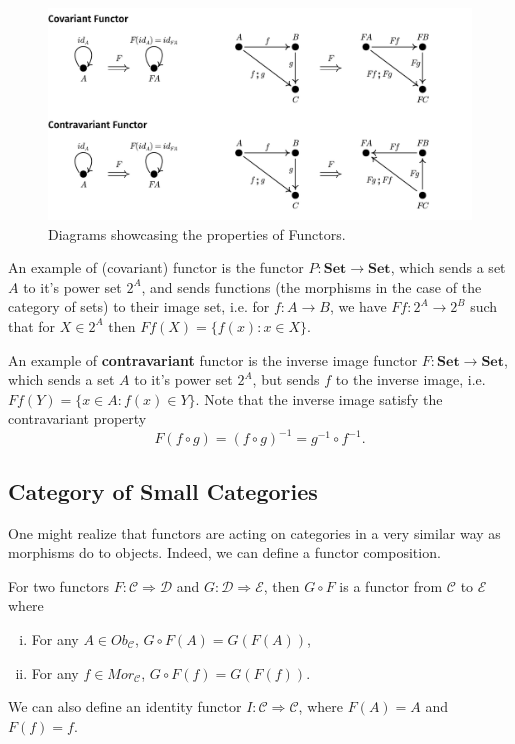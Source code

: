 \begin{figure}[H]
	\begin{center}
		\includegraphics[width=1.1\textwidth]{./notebooks/Functor.pdf}
	\end{center}
	\caption{Diagrams showcasing the properties of Functors.}
	\label{fig:Functor}
\end{figure}

\begin{example}
	An example of (covariant) functor is the functor
	$P : \mathbf{Set} \to \mathbf{Set}$, which sends a set $A$
	to it's power set $2^A$, and sends functions (the morphisms in the case
	of the category of sets) to their image set, i.e. for $f:A \to B$,
	we have $Ff:2^A \to 2^B$ such that for $X \in 2^A$ then $Ff(X) = \{f(x) : x \in X\}$.

	An example of \textbf{contravariant} functor is the inverse image functor
	$F : \mathbf{Set} \to \mathbf{Set}$, which sends a set $A$ to it's
	power set $2^A$, but sends $f$ to the inverse image, i.e.
	$Ff(Y) = \{x \in A : f(x) \in Y\}$.
	Note that the inverse image satisfy the contravariant property
	\begin{displaymath}
		F(f \circ g) = (f \circ g) ^{-1} = g^{-1} \circ f^{-1}.
	\end{displaymath}
\end{example}

\subsection{Category of Small Categories}

One might realize that functors are acting on categories in a very similar way as morphisms
do to objects. Indeed, we can define a functor composition.

\begin{definition}
	For two functors $F:\mathcal C \Rightarrow \mathcal D$
	and $G:\mathcal D \Rightarrow \mathcal E$, then $G \circ F$ is
	a functor from $\mathcal C$ to $\mathcal E$ where
	\begin{enumerate}[(i)]
		\item For any $A \in Ob_\mathcal C$, $G\circ F (A) = G(F(A))$,
		\item For any $f \in Mor_\mathcal C$, $G\circ F (f) = G(F(f))$.
	\end{enumerate}
\end{definition}
We can also define an identity functor $I:\mathcal C \Rightarrow \mathcal C$,
where $F(A) = A$ and $F(f) = f$.

